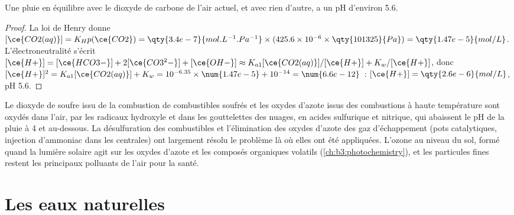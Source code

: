 \begin{proposition}\label{prop:b3:environmental-toxicology:rain-ph}
Une pluie en équilibre avec le dioxyde de carbone de l'air actuel, et avec
rien d'autre, a un pH d'environ 5.6.
\end{proposition}

\begin{proof}
La loi de Henry donne $[\ce{CO2(aq)}] = K_Hp(\ce{CO2}) = \qty{3.4e-7}{mol.L^{-1}.Pa^{-1}} \times (425.6 \times 10^{-6} \times \qty{101325}{Pa}) = \qty{1.47e-5}{mol/L}$. L'électroneutralité
s'écrit $[\ce{H+}] = [\ce{HCO3-}] + 2[\ce{CO3^2-}] + [\ce{OH-}] \approx K_{a1}[\ce{CO2(aq)}]/[\ce{H+}] + K_w/[\ce{H+}]$, donc
$[\ce{H+}]^2 = K_{a1}[\ce{CO2(aq)}] + K_w = 10^{-6.35} \times \num{1.47e-5} + 10^{-14} = \num{6.6e-12}$~: $[\ce{H+}] = \qty{2.6e-6}{mol/L}$, pH 5.6.
\end{proof}

Le dioxyde de soufre issu de la combustion de combustibles soufrés et les
oxydes d'azote issus des combustions à haute température sont oxydés dans
l'air, par les radicaux hydroxyle et dans les gouttelettes des nuages, en
acides sulfurique et nitrique, qui abaissent le pH de la pluie à 4 et
au-dessous. La désulfuration des combustibles et l'élimination des oxydes
d'azote des gaz d'échappement (pots catalytiques, injection d'ammoniac dans
les centrales) ont largement résolu le problème là où elles ont été
appliquées. L'ozone au niveau du sol, formé quand la lumière solaire agit
sur les oxydes d'azote et les composés organiques volatils
(\cref{ch:b3:photochemistry}), et les particules fines restent les
principaux polluants de l'air pour la santé.

\section{Les eaux naturelles}

